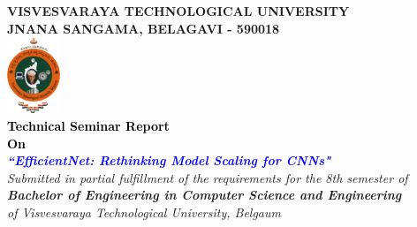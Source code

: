 \thispagestyle{empty}
\begin{titlepage}
\begin{center}
\textup{\large{\textcolor{darkbrown}{\bf VISVESVARAYA TECHNOLOGICAL UNIVERSITY} \\ {\textcolor{darkbrown}{\bf JNANA SANGAMA, BELAGAVI - 590018}}}}\\
\includegraphics[width=0.12\textwidth]{./../static/media/VTU.png}\\
\textup{\small{\textcolor{black}{\textbf{Technical Seminar Report} \\ {\textbf{On}}}}} \\
\textup{\large{\textcolor{blue}{\textbf{\textit{``EfficientNet: Rethinking Model Scaling for CNNs"}}}}} \\

\textup{{\textit {Submitted in partial fulfillment of the requirements for the 8th semester of} \\ {\textbf {\textit {Bachelor of Engineering in Computer Science and Engineering}} \\ \textit {of Visvesvaraya Technological University, Belgaum}}}}\\


\end{center}
\end{titlepage}
